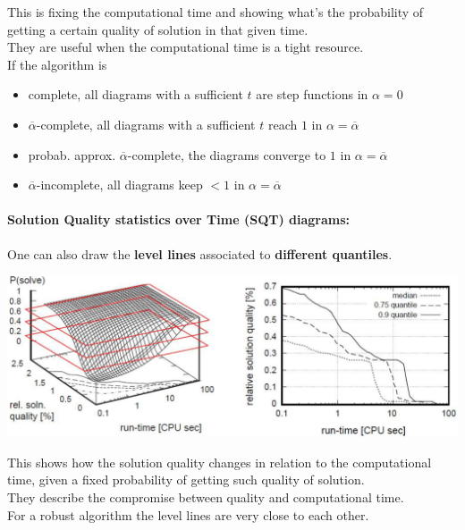 This is fixing the computational time and showing what's the probability of getting a certain quality of solution in that given time.\\

They are useful when the computational time is a tight resource.\\

If the algorithm is
\begin{itemize}
	\item complete, all diagrams with a sufficient $t$ are step functions in $\alpha = 0$
	\item $\overline{\alpha}$-complete, all diagrams with a sufficient $t$ reach $1$ in $\alpha = \overline{\alpha}$
	\item probab. approx. $\overline{\alpha}$-complete, the diagrams converge to $1$ in $\alpha = \overline{\alpha}$
	\item $\overline{\alpha}$-incomplete, all diagrams keep $< 1$ in $\alpha = \overline{\alpha}$
\end{itemize}

\newpage

\paragraph{Solution Quality statistics over Time (SQT) diagrams:} One can also draw the \textbf{level lines} associated to \textbf{different quantiles}. 
\begin{center}
	\includegraphics[width=\columnwidth]{img/SQT1}
\end{center}

This shows how the solution quality changes in relation to the computational time, given a fixed probability of getting such quality of solution. \\

They describe the compromise between quality and computational time.\\

For a robust algorithm the level lines are very close to each other.\\

